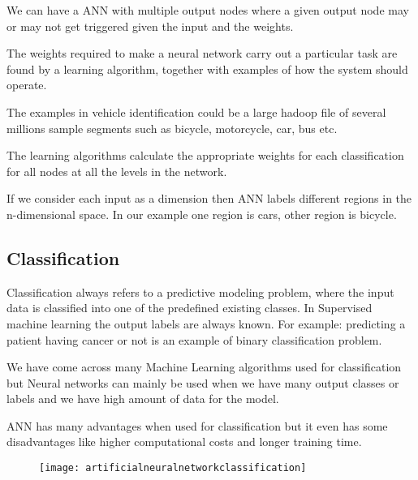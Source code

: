 	\begin{bulletedlist}
		\item We can have a ANN with multiple output nodes where a given output node may or may not get triggered given the input and the weights.
		\item The weights required to make a neural network carry out a particular task are found by a learning algorithm, together with  examples of how the system  should operate.
		\item The examples in vehicle identification could be a large hadoop file of several millions sample segments such as bicycle, motorcycle, car, bus etc.
		\item The learning algorithms calculate the appropriate weights for each classification for all nodes at all the levels in the network.
		\item If we consider each input as a dimension then ANN labels different regions in the n-dimensional space. In our example one region is cars, other region is bicycle.
	\end{bulletedlist}

	\subsection{Classification}
	\begin{bulletedlist}
		\item Classification always refers to a predictive modeling problem, where the input data is classified into one of the predefined existing classes. In Supervised machine learning the output labels are always known. For example: predicting a patient having cancer or not is an example of binary classification problem.
		\item We have come across many Machine Learning algorithms used for classification but Neural networks can mainly be used when we have many output classes or labels and we have high amount of data for the model.
		\item ANN has many advantages when used for classification but it even has some disadvantages like higher computational costs and longer training time.
	\end{bulletedlist}

 	\begin{figure}[h]
		\centering
		\texttt{[image: artificialneuralnetworkclassification]}
		\caption{}
		\label{fig:artificialneuralnetworkclassification}
	\end{figure}


